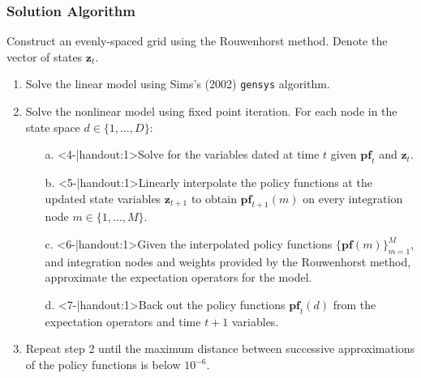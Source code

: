 \documentclass[11pt]{beamer}
\begin{document}
\begin{frame}\frametitle{Solution Algorithm} %
 Construct an evenly-spaced grid using the Rouwenhorst method. Denote the vector of states $\textbf{z}_t$. %
\begin{enumerate}\setlength{\itemsep}{8pt}

\item <2-|handout:1>Solve the linear model using Sims's (2002) \texttt{gensys} algorithm. 
\item <3-|handout:1>Solve the nonlinear model using fixed point iteration. For each node in the state space $d \in \{1,\dots,D\}:$
\begin{enumerate}\setlength{\itemsep}{2pt}
\item[a.] <4-|handout:1>Solve for the variables dated at time $t$ given $\textbf{pf}_t$ and $\textbf{z}_t$. %
\item[b.]  <5-|handout:1>Linearly interpolate the policy functions at the updated state variables $\textbf{z}_{t+1}$ to obtain $\textbf{pf}_{t+1}(m)$ on every integration node $m \in \{1,\dots,M\}$.%
\item[c.] <6-|handout:1>Given the interpolated policy functions $\{\textbf{pf}(m)\}_{m=1}^M$, and integration nodes and weights provided by the Rouwenhorst method, approximate the expectation operators for the model. %
\item[d.] <7-|handout:1>Back out the policy functions $\textbf{pf}_t(d)$ from the expectation operators and time $t+1$ variables. %
\end{enumerate}
\item <8-|handout:1>Repeat step 2 until the maximum distance between successive approximations of the policy functions is below $10^{-6}$. 
\end{enumerate}
\end{frame}
\end{document}
